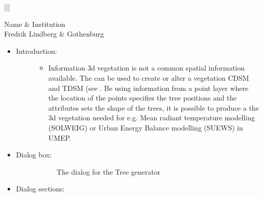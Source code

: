 \documentclass[letterpaper,10pt,english]{sphinxmanual}
\begin{document}
\begin{savenotes}\sphinxattablestart
\centering
\begin{tabular}[t]{|||}
\hline

Name
&
Institution
\\
\hline
Fredrik Lindberg
&
Gothenburg
\\
\hline
\end{tabular}
\par
\sphinxattableend\end{savenotes}
\begin{itemize}
\item {} \begin{description}
\item[{Introduction:}] \leavevmode\begin{itemize}
\item {} 
Information 3d vegetation is not a common spatial information available. The  can be used to create or alter a vegetation CDSM and TDSM (see {\hyperref[\detokenize{Abbreviations:abbreviations}]{}}. Be using information from a point layer where the location of the points specifies the tree positions and the attributes sets the shape of the trees, it is possible to produce a the 3d vegetation needed for e.g. Mean radiant temperature modelling (SOLWEIG) or Urban Energy Balance modelling (SUEWS) in UMEP.

\end{itemize}

\end{description}

\item {} \begin{description}
\item[{Dialog box:}] \leavevmode
\begin{figure}[htbp]
\centering
\capstart

\noindent{}
\caption{The dialog for the Tree generator}\label{\detokenize{pre-processor/Spatial Data Tree Generator:id1}}\end{figure}

\end{description}

\item {} 
Dialog sections:

\end{itemize}
\end{document}

